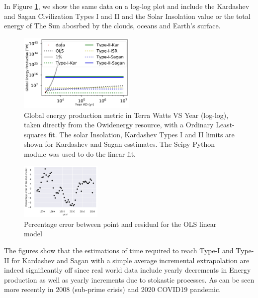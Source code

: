 \documentclass[final,5p,times,twocolumn,authoryear]{elsarticle}
\begin{document}
In Figure \ref{fig:kardashev3}, we show the same data on a log-log plot and include the Kardashev and Sagan Civilization Types I and II and the Solar Insolation value or the total energy of The Sun abosrbed by the clouds, oceans and Earth's surface. %


\begin{figure}
    \centering
    \includegraphics[width=0.5\textwidth]{figs/fig2_kar.jpg}
    \caption{Global energy production metric in Terra Watts VS Year (log-log), taken directly from the Owidenergy resource, with a Ordinary Least-squares fit. The solar Insolation, Kardashev Types I and II limits are shown for Kardashev and Sagan esstimates. The Scipy Python module was used to do the linear fit.}
    \label{fig:kardashev3}

\end{figure}

\begin{figure}
    \centering
    \includegraphics[width=0.35\textwidth]{figs/fig1p_kar_res.jpg}
    \caption{Percentage error between point and residual for the OLS
    linear model}
    \label{fig:kardashev1_res}

\end{figure}

The figures show that the estimations of time required to reach Type-I and Type-II for Kardashev and Sagan with a simple average incremental extrapolation are indeed significantly off since real world data include yearly decrements in Energy production as well as yearly increments due to stokastic processes. As can be seen more recently in 2008 (sub-prime crisis) and 2020 COVID19 pandemic.
\end{document}
